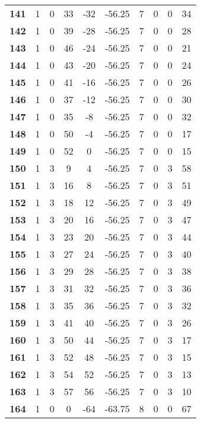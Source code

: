 \documentclass{article}%
\begin{document}
\begin{longtable}{cccccccccc}
        \textbf{141} & 1 & 0 & 33 & -32 & -56.25 & 7 & 0 & 0 & 34 \\ 
        \textbf{142} & 1 & 0 & 39 & -28 & -56.25 & 7 & 0 & 0 & 28 \\ 
        \textbf{143} & 1 & 0 & 46 & -24 & -56.25 & 7 & 0 & 0 & 21 \\ 
        \textbf{144} & 1 & 0 & 43 & -20 & -56.25 & 7 & 0 & 0 & 24 \\ 
        \textbf{145} & 1 & 0 & 41 & -16 & -56.25 & 7 & 0 & 0 & 26 \\ 
        \textbf{146} & 1 & 0 & 37 & -12 & -56.25 & 7 & 0 & 0 & 30 \\ 
        \textbf{147} & 1 & 0 & 35 & -8 & -56.25 & 7 & 0 & 0 & 32 \\ 
        \textbf{148} & 1 & 0 & 50 & -4 & -56.25 & 7 & 0 & 0 & 17 \\ 
        \textbf{149} & 1 & 0 & 52 & 0 & -56.25 & 7 & 0 & 0 & 15 \\ 
        \textbf{150} & 1 & 3 & 9 & 4 & -56.25 & 7 & 0 & 3 & 58 \\ 
        \textbf{151} & 1 & 3 & 16 & 8 & -56.25 & 7 & 0 & 3 & 51 \\ 
        \textbf{152} & 1 & 3 & 18 & 12 & -56.25 & 7 & 0 & 3 & 49 \\ 
        \textbf{153} & 1 & 3 & 20 & 16 & -56.25 & 7 & 0 & 3 & 47 \\ 
        \textbf{154} & 1 & 3 & 23 & 20 & -56.25 & 7 & 0 & 3 & 44 \\ 
        \textbf{155} & 1 & 3 & 27 & 24 & -56.25 & 7 & 0 & 3 & 40 \\ 
        \textbf{156} & 1 & 3 & 29 & 28 & -56.25 & 7 & 0 & 3 & 38 \\ 
        \textbf{157} & 1 & 3 & 31 & 32 & -56.25 & 7 & 0 & 3 & 36 \\ 
        \textbf{158} & 1 & 3 & 35 & 36 & -56.25 & 7 & 0 & 3 & 32 \\ 
        \textbf{159} & 1 & 3 & 41 & 40 & -56.25 & 7 & 0 & 3 & 26 \\ 
        \textbf{160} & 1 & 3 & 50 & 44 & -56.25 & 7 & 0 & 3 & 17 \\ 
        \textbf{161} & 1 & 3 & 52 & 48 & -56.25 & 7 & 0 & 3 & 15 \\ 
        \textbf{162} & 1 & 3 & 54 & 52 & -56.25 & 7 & 0 & 3 & 13 \\ 
        \textbf{163} & 1 & 3 & 57 & 56 & -56.25 & 7 & 0 & 3 & 10 \\ 
        \textbf{164} & 1 & 0 & 0 & -64 & -63.75 & 8 & 0 & 0 & 67 \\ 

\end{longtable}
\end{document}
